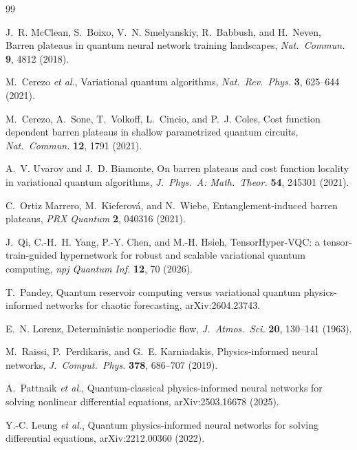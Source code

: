 \documentclass[a4paper,12pt]{iopart}
\begin{document}
\begin{thebibliography}{99}

J.~R. McClean, S.~Boixo, V.~N. Smelyanskiy, R.~Babbush, and H.~Neven,
Barren plateaus in quantum neural network training landscapes,
\textit{Nat.\ Commun.} \textbf{9}, 4812 (2018).

M.~Cerezo \textit{et al.},
Variational quantum algorithms,
\textit{Nat.\ Rev.\ Phys.} \textbf{3}, 625--644 (2021).

M.~Cerezo, A.~Sone, T.~Volkoff, L.~Cincio, and P.~J. Coles,
Cost function dependent barren plateaus in shallow parametrized quantum
circuits,
\textit{Nat.\ Commun.} \textbf{12}, 1791 (2021).

A.~V. Uvarov and J.~D. Biamonte,
On barren plateaus and cost function locality in variational quantum algorithms,
\textit{J.\ Phys.\ A: Math.\ Theor.} \textbf{54}, 245301 (2021).

C.~Ortiz Marrero, M.~Kieferov\'a, and N.~Wiebe,
Entanglement-induced barren plateaus,
\textit{PRX Quantum} \textbf{2}, 040316 (2021).

J.~Qi, C.-H.~H. Yang, P.-Y. Chen, and M.-H. Hsieh,
TensorHyper-VQC: a tensor-train-guided hypernetwork for robust and scalable
variational quantum computing,
\textit{npj Quantum Inf.} \textbf{12}, 70 (2026).

T.~Pandey,
Quantum reservoir computing versus variational quantum physics-informed
networks for chaotic forecasting,
arXiv:2604.23743.

E.~N. Lorenz,
Deterministic nonperiodic flow,
\textit{J.\ Atmos.\ Sci.} \textbf{20}, 130--141 (1963).

M.~Raissi, P.~Perdikaris, and G.~E. Karniadakis,
Physics-informed neural networks,
\textit{J.\ Comput.\ Phys.} \textbf{378}, 686--707 (2019).

A.~Pattnaik \textit{et al.},
Quantum-classical physics-informed neural networks for solving nonlinear
differential equations,
arXiv:2503.16678 (2025).

Y.-C. Leung \textit{et al.},
Quantum physics-informed neural networks for solving differential equations,
arXiv:2212.00360 (2022).


\end{thebibliography}
\end{document}
